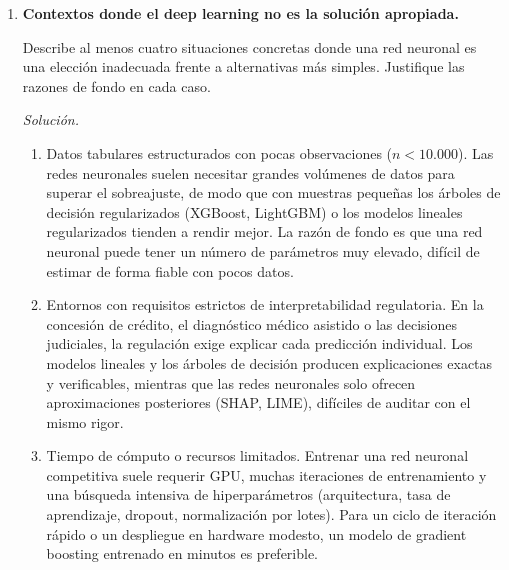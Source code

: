 \documentclass[12pt]{article}
\newcommand\sol[1]{\begin{mdframed}
\emph{Solución.} #1
\end{mdframed}}
\begin{document}
\begin{enumerate}
{\medskip
Sobre su competitividad como referencia, LightGBM con hiperparámetros por defecto suele rendir muy
bien en datos tabulares estructurados y destaca con frecuencia tanto en competiciones como en
comparativas frente a las redes neuronales tabulares. Y en cuanto a la facilidad de despliegue, el
modelo serializado es un artefacto ligero, con una inferencia rápida y de latencia predecible que no
depende de GPU.

\medskip
La razón para preferirlo como única apuesta de por vida no es que sea siempre el mejor, sino que rara
vez es una mala elección: cuando no gana, suele quedar cerca, y su ecosistema de herramientas (SHAP
nativo, early stopping, validación cruzada integrada) lo hace cómodo de usar en casi cualquier
problema tabular.
}

\item \textbf{Contextos donde el deep learning no es la solución apropiada.}

Describe al menos cuatro situaciones concretas donde una red neuronal es una elección inadecuada
frente a alternativas más simples. Justifique las razones de fondo en cada caso.

\sol{

\begin{enumerate}[1.]
  \item Datos tabulares estructurados con pocas observaciones ($n < 10.000$). Las redes neuronales
  suelen necesitar grandes volúmenes de datos para superar el sobreajuste, de modo que con muestras
  pequeñas los árboles de decisión regularizados (XGBoost, LightGBM) o los modelos lineales
  regularizados tienden a rendir mejor. La razón de fondo es que una red neuronal puede tener un
  número de parámetros muy elevado, difícil de estimar de forma fiable con pocos datos.

  \item Entornos con requisitos estrictos de interpretabilidad regulatoria. En la concesión de
  crédito, el diagnóstico médico asistido o las decisiones judiciales, la regulación exige explicar
  cada predicción individual. Los modelos lineales y los árboles de decisión producen explicaciones
  exactas y verificables, mientras que las redes neuronales solo ofrecen aproximaciones posteriores
  (SHAP, LIME), difíciles de auditar con el mismo rigor.

  \item Tiempo de cómputo o recursos limitados. Entrenar una red neuronal competitiva suele requerir
  GPU, muchas iteraciones de entrenamiento y una búsqueda intensiva de hiperparámetros (arquitectura,
  tasa de aprendizaje, dropout, normalización por lotes). Para un ciclo de iteración rápido o un
  despliegue en hardware modesto, un modelo de gradient boosting entrenado en minutos es preferible.


\end{enumerate}}
\end{enumerate}
\end{document}
